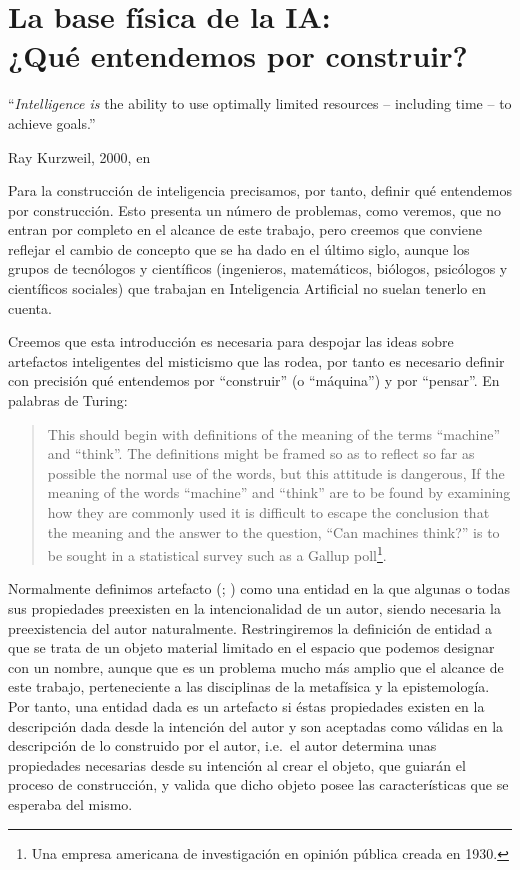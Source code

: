 \documentclass[12pt]{memoir}
\begin{document}
\chapter[La base física de la IA: ¿Qué entendemos por construir?]{La base física de la IA: \\ ¿Qué entendemos por construir?}
\label{construct}
\epigraph{``\textit{Intelligence is} the ability to use optimally limited resources – including time – to achieve goals.''}{Ray Kurzweil, 2000, en \parencite{intDefs}}

Para la construcción de inteligencia precisamos, por tanto, definir qué entendemos por construcción. Esto presenta un número de problemas, como veremos, que no entran por completo en el alcance de este trabajo, pero creemos que conviene reflejar el cambio de concepto que se ha dado en el último siglo, aunque los grupos de tecnólogos y científicos (ingenieros, matemáticos, biólogos, psicólogos y científicos sociales) que trabajan en Inteligencia Artificial no suelan tenerlo en cuenta. 

Creemos que esta introducción es necesaria para despojar las ideas sobre artefactos inteligentes del misticismo que las rodea, por tanto es necesario definir con precisión qué entendemos por ``construir'' (o ``máquina'') y por ``pensar''. En palabras de Turing:

\begin{quotation}
This should begin with definitions of the meaning of the terms ``machine'' and ``think''. The definitions might be framed so as to reflect so far as possible the normal use of the words, but this attitude is dangerous, If the meaning of the words ``machine'' and ``think'' are to be found by examining how they are commonly used it is difficult to escape the conclusion that the meaning and the answer to the question, ``Can machines think?'' is to be sought in a statistical survey such as a Gallup poll\footnote{Una empresa americana de investigación en opinión pública creada en 1930.}. \parencite[apartado 1]{Turing1950cmi}
\end{quotation}

Normalmente definimos artefacto (\cite[apartado 2.5]{sep-technology}; \cite[apartado 4]{sep-artifact}) como una entidad en la que algunas o todas sus propiedades preexisten en la intencionalidad de un autor, siendo necesaria la preexistencia del autor naturalmente. Restringiremos la definición de entidad a que se trata de un objeto material limitado en el espacio que podemos designar con un nombre, aunque que es un problema mucho más amplio que el alcance de este trabajo, perteneciente a las disciplinas de la metafísica y la epistemología. Por tanto, una entidad dada es un artefacto si éstas propiedades existen en la descripción dada desde la intención del autor y son aceptadas como válidas en la descripción de lo construido por el autor, i.e.\ el autor determina unas propiedades necesarias desde su intención al crear el objeto, que guiarán el proceso de construcción, y valida que dicho objeto posee las características que se esperaba del mismo.
\end{document}
